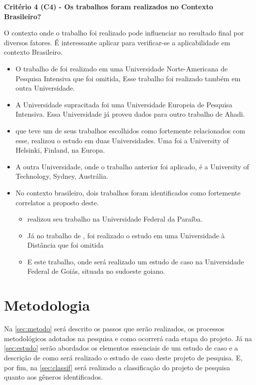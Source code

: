 \documentclass[
	12pt,				%
	openright,			%
	oneside,
	a4paper,			%
	english,			%
	french,				%
	spanish,			%
	brazil,				%
	]{abntex2}
\begin{document}
\textbf{Critério 4 (C4) - Os trabalhos foram realizados no Contexto Brasileiro?}

O contexto onde o trabalho foi realizado pode influenciar no resultado final por diversos fatores. É interessante aplicar para verificar-se a aplicabilidade em contexto Brasileiro.

\begin{itemize}
    \item O trabalho de  foi realizado em uma Universidade Norte-Americana de Pesquisa Intensiva que foi omitida, Esse trabalho foi realizado também em outra Universidade.
    \item A Universidade supracitada foi uma Universidade Europeia de Pesquisa Intensiva. Essa Universidade já proveu dados para outro trabalho de Ahadi.
    \item {} que teve um de seus trabalhos escolhidos como fortemente relacionados com esse, realizou o estudo em duas Universidades. Uma foi a University of Helsinki, Finland, na Europa.
    \item A outra Universidade, onde o trabalho anterior foi aplicado, é a University of Technology, Sydney, Austrália.
    \item No contexto brasileiro, dois trabalhos foram identificados como fortemente correlatos a proposto deste.
        \begin{itemize}
            \item {} realizou seu trabalho na Universidade Federal da Paraíba.
            \item Já no trabalho de , foi realizado o estudo em uma Universidade à Distância que foi omitida
            \item E este trabalho, onde será realizado um estudo de caso na Universidade Federal de Goiás, situada no sudoeste goiano.
    \end{itemize}
\end{itemize}


\chapter{Metodologia}

Na \autoref{sec:metodo} será descrito os passos que serão realizados, os processos metodológicos adotados na pesquisa e como ocorrerá cada etapa do projeto. Já na \autoref{sec:estudo} serão abordados os elementos essenciais de um estudo de caso e a descrição de como será realizado o estudo de caso deste projeto de pesquisa. E, por fim, na \autoref{sec:classif} será realizado a classificação do projeto de pesquisa quanto aos gêneros identificados.
\end{document}
